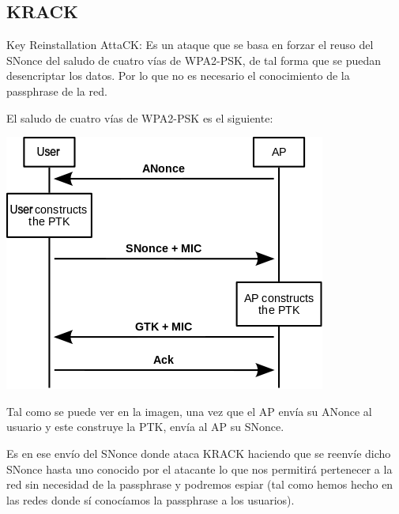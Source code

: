 \subsection{KRACK}
Key Reinstallation AttaCK: Es un ataque que se basa en forzar el reuso del SNonce del saludo de cuatro vías de WPA2-PSK, de tal forma que se puedan desencriptar los datos. Por lo que no es necesario el conocimiento de la passphrase de la red.

El saludo de cuatro vías de WPA2-PSK es el siguiente:
\begin{center}
	\includegraphics[scale=0.7]{Saludo4vias.png}
\end{center}
Tal como se puede ver en la imagen, una vez que el AP envía su ANonce al usuario y este construye la PTK, envía al AP su SNonce.

Es en ese envío del SNonce donde ataca KRACK haciendo que se reenvíe dicho SNonce hasta uno conocido por el atacante lo que nos permitirá pertenecer a la red sin necesidad de la passphrase y podremos espiar (tal como hemos hecho en las redes donde sí conocíamos la passphrase a los usuarios).

